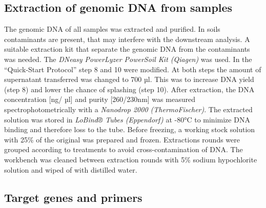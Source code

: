 \documentclass[twoside,12pt,final]{ucthesis-CA2012}
\begin{document}
\begin{ucmainmatter}
\hypertarget{extraction-of-genomic-dna-from-samples}{%
\subsection{Extraction of genomic DNA from samples}\label{extraction-of-genomic-dna-from-samples}}

The genomic DNA of all samples was extracted and purified. In soils contaminants are present, that may interfere with the downstream analysis. A suitable extraction kit that separate the genomic DNA from the contaminants was needed. The \emph{DNeasy PowerLyzer PowerSoil Kit (Qiagen)} was used. In the ``Quick-Start Protocol'' step 8 and 10 were modified. At both steps the amount of supernatant transferred was changed to 700 µl. This was to increase DNA yield (step 8) and lower the chance of splashing (step 10). After extraction, the DNA concentration {[}ng/ µl{]} and purity {[}260/230nm{]} was measured spectrophotometrically with a \emph{Nanodrop 2000 (ThermoFischer)}. The extracted solution was stored in \emph{LoBind® Tubes (Eppendorf)} at -80°C to minimize DNA binding and therefore loss to the tube. Before freezing, a working stock solution with 25\% of the original was prepared and frozen. Extractions rounds were grouped according to treatments to avoid cross-contamination of DNA. The workbench was cleaned between extraction rounds with 5\% sodium hypochlorite solution and wiped of with distilled water.

\hypertarget{target-genes-and-primers}{%
\subsection{Target genes and primers}\label{target-genes-and-primers}}


\end{ucmainmatter}
\end{document}

